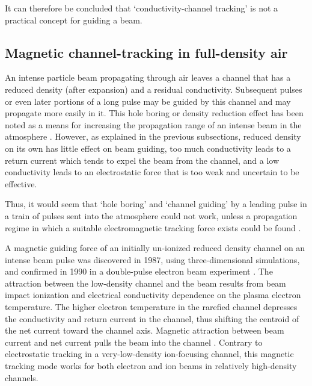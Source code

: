 \documentclass [12pt,a4paper,     ]{report} %
\begin{document}
   It can therefore be concluded that `conductivity-channel tracking' is not a practical concept for guiding a beam.


\subsection{Magnetic channel-tracking in full-density air}
 
    An intense particle beam propagating through air leaves a channel that has a reduced density (after expansion) and a residual conductivity.  Subsequent pulses or even later portions of a long pulse may be guided by this channel and may propagate more easily in it.  This hole boring or density reduction effect has been noted as a means for increasing the propagation range of an intense beam in the atmosphere \cite{MURPH1987-}.  However, as explained in the previous subsections, reduced density on its own has little effect on beam guiding, too much conductivity leads to a return current which tends to expel the beam from the channel, and a low conductivity leads to an electrostatic force that is too weak and uncertain to be effective.

   Thus, it would seem that `hole boring' and `channel guiding' by a leading pulse in a train of pulses sent into the atmosphere could not work, unless a propagation regime in which a suitable electromagnetic tracking force exists could be found \cite{MURPH1987-}. 

   A magnetic guiding force of an initially un-ionized reduced density channel on an intense beam pulse was discovered in 1987, using three-dimensional simulations, and confirmed in 1990 in a double-pulse electron beam experiment \cite{WELCH1990-}.  The attraction between the low-density channel and the beam results from beam impact ionization and electrical conductivity dependence on the plasma electron temperature.  The higher  electron temperature in the rarefied channel depresses the conductivity and return current in the channel, thus shifting the centroid of the net current toward the channel axis.  Magnetic attraction between beam current and net current pulls the beam into the channel \cite{FERNS1991A}.  Contrary to electrostatic tracking in a very-low-density  ion-focusing channel, this magnetic tracking mode works for both electron and ion beams in relatively high-density channels. 
\end{document}
